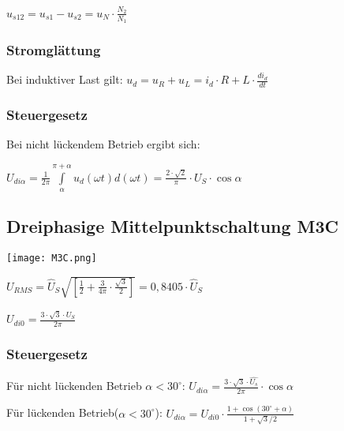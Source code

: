 \documentclass[german]{latex4ei/latex4ei_sheet}
\begin{document}
\begin{sectionbox}
\begin{symbolbox}
			$u_{s12} = u_{s1}-u_{s2} = u_N \cdot \frac{N_2}{N_1}$
			\subsubsection{Stromglättung}
				Bei induktiver Last gilt: $u_d = u_R + u_L = i_d\cdot R+L\cdot \frac{di_d}{dt}$
			\subsubsection{Steuergesetz}
				Bei nicht lückendem Betrieb ergibt sich:

				$U_{di\alpha} = \frac{1}{2\pi}\int\limits_\alpha^{\pi+\alpha}u_d(\omega t)d(\omega  t) = \frac{2\cdot \sqrt{2}}{\pi}\cdot U_S \cdot \cos \alpha$
		\end{symbolbox}
		\begin{symbolbox}
		\subsection{Dreiphasige Mittelpunktschaltung M3C}
			\texttt{[image: M3C.png]}

			$U_{RMS} = \hat{U}_S \sqrt{\left[ \frac{1}{2}+\frac{3}{4\pi}\cdot \frac{\sqrt{3}}{2}\right]} = 0,8405\cdot \hat{U}_S$
			
			$U_{di0} = \frac{3\cdot \sqrt{3}\cdot \hat{U}_S}{2\pi}$

			\subsubsection{Steuergesetz}
			Für nicht lückenden Betrieb $\alpha < 30^\circ$: $U_{di\alpha} = \frac{3\cdot \sqrt{3}\cdot \hat{U_s}}{2\pi}\cdot \cos \alpha$

			Für lückenden Betrieb($\alpha < 30^\circ$): $U_{di\alpha} = U_{di0}\cdot \frac{1+\cos(30^\circ + \alpha)}{1+\sqrt{3}/2}$
		\end{symbolbox}
	\end{sectionbox}
\end{document}
